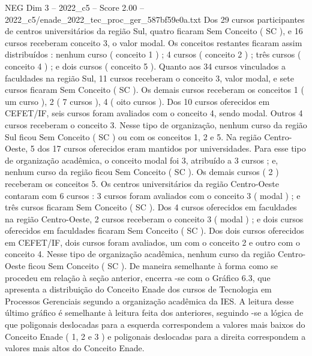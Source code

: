 \begin{textsample}{NEG Dim 3 – 2022\_c5 – Score 2.00 – 2022\_c5/enade\_2022\_tec\_proc\_ger\_587bf59e0a.txt}
Dos 29 cursos participantes de centros universitários da região Sul, quatro ficaram Sem Conceito ( SC ), e 16 cursos receberam conceito 3, o valor modal.
Os conceitos restantes ficaram assim distribuídos : nenhum curso ( conceito 1 ) ; 4 cursos ( conceito 2 ) ; três cursos ( conceito 4 ) ; e dois cursos ( conceito 5 ).
Quanto aos 34 cursos vinculados a faculdades na região Sul, 11 cursos receberam o conceito 3, valor modal, e sete cursos ficaram Sem Conceito ( SC ).
Os demais cursos receberam os conceitos 1 ( um curso ), 2 ( 7 cursos ), 4 ( oito cursos ).
Dos 10 cursos oferecidos em CEFET/IF, seis cursos foram avaliados com o conceito 4, sendo modal.
Outros 4 cursos receberam o conceito 3.
Nesse tipo de organização, nenhum curso da região Sul ficou Sem Conceito ( SC ) ou com os conceitos 1, 2 e 5.
Na região Centro-Oeste, 5 dos 17 cursos oferecidos eram mantidos por universidades.
Para esse tipo de organização acadêmica, o conceito modal foi 3, atribuído a 3 cursos ; e, nenhum curso da região ficou Sem Conceito ( SC ).
Os demais cursos ( 2 ) receberam os conceitos 5.
Os centros universitários da região Centro-Oeste contaram com 6 cursos : 3 cursos foram avaliados com o conceito 3 ( modal ) ; e três cursos ficaram Sem Conceito ( SC ).
Dos 4 cursos oferecidos em faculdades na região Centro-Oeste, 2 cursos receberam o conceito 3 ( modal ) ; e dois cursos oferecidos em faculdades ficaram Sem Conceito ( SC ).
Dos dois cursos oferecidos em CEFET/IF, dois cursos foram avaliados, um com o conceito 2 e outro com o conceito 4.
Nesse tipo de organização acadêmica, nenhum curso da região Centro-Oeste ficou Sem Conceito ( SC ).
De maneira semelhante à forma como se procedeu em relação à seção anterior, encerra -se com o Gráfico 6.3, que apresenta a distribuição do Conceito Enade dos cursos de Tecnologia em Processos Gerenciais segundo a organização acadêmica da IES.
A leitura desse último gráfico é semelhante à leitura feita dos anteriores, seguindo -se a lógica de que poligonais deslocadas para a esquerda correspondem a valores mais baixos do Conceito Enade ( 1, 2 e 3 ) e poligonais deslocadas para a direita correspondem a valores mais altos do Conceito Enade.

\end{textsample}
